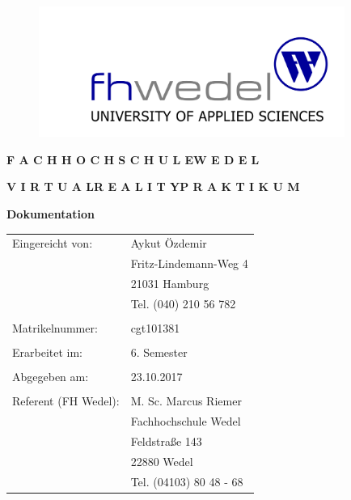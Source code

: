 
\begin{titlepage}
\thispagestyle{empty}
\begin{center}

\begin{figure}[H]
\centering
\includegraphics[width=10cm]{Bilder/Deckblatt/fh-wedel-logo.png}
\end{figure}

\vspace*{1cm}

\Large{\textbf{F A C H H O C H S C H U L E\quad W E D E L\\}}

\vspace*{0.25cm}

\Large{\textbf{V I R T U A L\quad R E A L I T Y\quad P R A K T I K U M\\}}

\vspace*{2.5cm}

\huge{\textbf{Dokumentation\\}}

\vspace*{2.5cm}

\vfill
\begin{table}[h]
\begin{tabular}{l l}
Eingereicht von: & Aykut Özdemir\\
& Fritz-Lindemann-Weg 4\\
& 21031 Hamburg\\
& Tel. (040) 210 56 782\\
& \\
Matrikelnummer: & cgt101381\\
& \\
Erarbeitet im: & 6. Semester\\
& \\
Abgegeben am: & 23.10.2017\\
& \\
Referent (FH Wedel): & M. Sc. Marcus Riemer\\
& Fachhochschule Wedel\\
& Feldstraße 143\\
& 22880 Wedel\\
& Tel. (04103) 80 48 - 68\\
\end{tabular}
\end{table}
\end{center}
\end{titlepage}